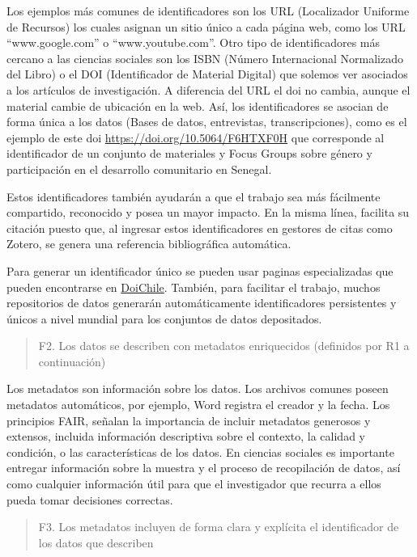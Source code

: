 \documentclass[
  14pt,
]{book}
\begin{document}
Los ejemplos más comunes de identificadores son los URL (Localizador Uniforme de Recursos) los cuales asignan un sitio único a cada página web, como los URL ``www.google.com'' o ``www.youtube.com''. Otro tipo de identificadores más cercano a las ciencias sociales son los ISBN (Número Internacional Normalizado del Libro) o el DOI (Identificador de Material Digital) que solemos ver asociados a los artículos de investigación. A diferencia del URL el doi no cambia, aunque el material cambie de ubicación en la web. Así, los identificadores se asocian de forma única a los datos (Bases de datos, entrevistas, transcripciones), como es el ejemplo de este doi \url{https://doi.org/10.5064/F6HTXF0H} que corresponde al identificador de un conjunto de materiales y Focus Groups sobre género y participación en el desarrollo comunitario en Senegal.

Estos identificadores también ayudarán a que el trabajo sea más fácilmente compartido, reconocido y posea un mayor impacto. En la misma línea, facilita su citación puesto que, al ingresar estos identificadores en gestores de citas como Zotero, se genera una referencia bibliográfica automática.

Para generar un identificador único se pueden usar paginas especializadas que pueden encontrarse en \href{https://doichile.cl/conseguir-doi/}{DoiChile}. También, para facilitar el trabajo, muchos repositorios de datos generarán automáticamente identificadores persistentes y únicos a nivel mundial para los conjuntos de datos depositados.

\begin{quote}
F2. Los datos se describen con metadatos enriquecidos (definidos por R1 a continuación)
\end{quote}

Los metadatos son información sobre los datos. Los archivos comunes poseen metadatos automáticos, por ejemplo, Word registra el creador y la fecha. Los principios FAIR, señalan la importancia de incluir metadatos generosos y extensos, incluida información descriptiva sobre el contexto, la calidad y condición, o las características de los datos. En ciencias sociales es importante entregar información sobre la muestra y el proceso de recopilación de datos, así como cualquier información útil para que el investigador que recurra a ellos pueda tomar decisiones correctas.

\begin{quote}
F3. Los metadatos incluyen de forma clara y explícita el identificador de los datos que describen
\end{quote}
\end{document}
